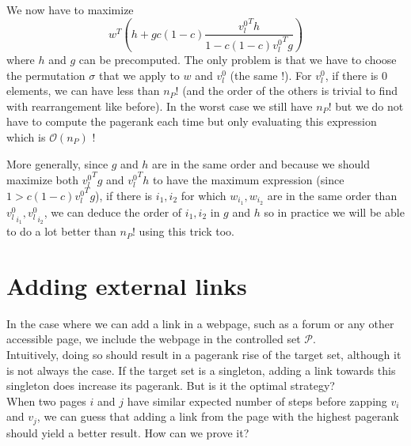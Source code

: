 \documentclass{article}
\newcommand{\bigoh}{\mathcal{O}}
\newcommand{\1}{\mathbf{1}}
\theoremstyle{definition}
\begin{document}
We now have to maximize
\[ w^T \left(h + g c(1-c) \frac{{v_l^0}^Th}{1 - c(1-c){v_l^0}^Tg}\right) \]
where $h$ and $g$ can be precomputed.
The only problem is that we have to choose the permutation $\sigma$ that we apply to $w$ and $v_l^0$ (the same !).
For $v_l^0$, if there is 0 elements, we can have less than $n_P!$ (and the order of the others is trivial to find with rearrangement like before).
In the worst case we still have $n_P!$ but we do not have to compute the pagerank each time but only evaluating this expression which is $\bigoh(n_P)$ !

More generally, since $g$ and $h$ are in the same order  and because we should maximize both ${v_l^0}^Tg$ and ${v_l^0}^Th$ to have the maximum expression (since $1 > c(1-c){v_l^0}^Tg$),
if there is $i_1, i_2$ for which $w_{i_1}, w_{i_2}$ are in the same order than ${v_l^0}_{i_1}, {v_l^0}_{i_2}$,
we can deduce the order of $i_1, i_2$ in $g$ and $h$ so in practice we will be able to do a lot better than $n_P!$ using this trick too.

\section{Adding external links}
In the case where we can add a link in a webpage, such as a forum or any other accessible page, we include the webpage in the controlled set $\mathcal{P}$.\\
Intuitively, doing so should result in a pagerank rise of the target set, although it is not always the case.
If the target set is a singleton, adding a link towards this singleton does increase its pagerank. But is it the optimal strategy?\\
When two pages $i$ and $j$ have similar expected number of steps before zapping $v_i$ and $v_j$, we can guess that adding a link from the page with the highest pagerank should yield a better result. How can we prove it? 

\subsection{}
\end{document}
